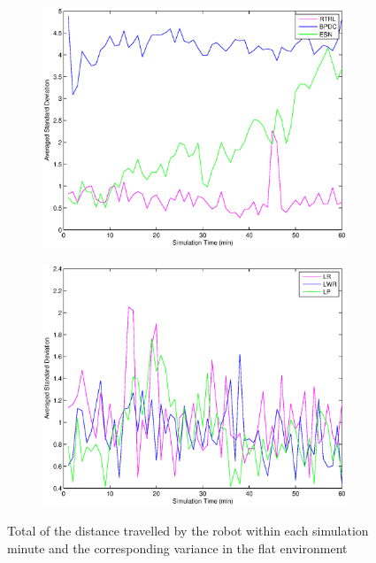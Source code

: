 \documentclass[msc,ai,logo]{infthesis}
\begin{document}
\begin{figure}[H]
\begin{subfigure}[b]{0.49\columnwidth}
               \label{fig:LR_00_DIST}  
        \end{subfigure}
        ~ %
        \begin{subfigure}[b]{0.49\columnwidth}
                \centering
                \includegraphics[width=\columnwidth]{RNN_00_DISTvar.eps}
                \label{RNN_00_DISTvar}
        \end{subfigure}
\begin{subfigure}[b]{0.49\textwidth}
                \centering
                \includegraphics[width=\columnwidth]{LR_00_DISTvar.eps}
         \label{LR_00_DISTvar}        
        \end{subfigure}
        \caption{Total of the distance travelled by the robot within each simulation minute and the corresponding variance in the flat environment}
          \label{fig:00_DIST}
\end{figure}
\end{document}
